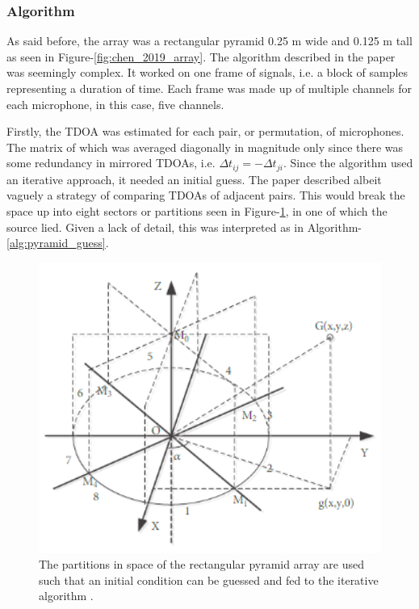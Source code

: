 \documentclass{report}
\begin{document}
\subsubsection{Algorithm}

As said before, the array was a rectangular pyramid 0.25 \si{m} wide and 0.125 \si{m} tall as seen in Figure-\ref{fig:chen_2019_array}. The algorithm described in the paper \cite{chen_sound_2019} was seemingly complex. It worked on one frame of signals, i.e. a block of samples representing a duration of time. Each frame was made up of multiple channels for each microphone, in this case, five channels. 

Firstly, the TDOA was estimated for each pair, or permutation, of microphones. The matrix of which was averaged diagonally in magnitude only since there was some redundancy in mirrored TDOAs, i.e. $\Delta t_{ij} = -\Delta t_{ji}$. Since the algorithm used an iterative approach, it needed an initial guess. The paper described albeit vaguely a strategy of comparing TDOAs of adjacent pairs. This would break the space up into eight sectors or partitions seen in Figure-\ref{fig:chen_2019_partitions}, in one of which the source lied. Given a lack of detail, this was interpreted as in Algorithm-\ref{alg:pyramid_guess}.

\begin{figure}[H]
\includegraphics[width=1\textwidth]{./chen_2019/partitions.png}
\centering
\caption{The partitions in space of the rectangular pyramid array are used such that an initial condition can be guessed and fed to the iterative algorithm \cite{chen_sound_2019}.}
\label{fig:chen_2019_partitions}
\centering
\end{figure}
\end{document}
